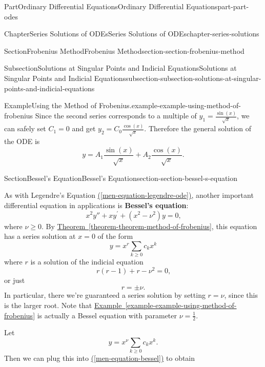 \documentclass[twoside,10pt,]{book}
\newcommand{\xreffont}{\relax}
\newcommand{\terminology}[1]{\textbf{#1}}
\numberwithin{equation}{part}
\begin{document}
\begin{partptx}{Part}{Ordinary Differential Equations}{}{Ordinary Differential Equations}{}{}{part-part-odes}
\begin{chapterptx}{Chapter}{Series Solutions of ODEs}{}{Series Solutions of ODEs}{}{}{chapter-series-solutions}
\begin{sectionptx}{Section}{Frobenius Method}{}{Frobenius Method}{}{}{section-section-frobenius-method}
\begin{subsectionptx}{Subsection}{Solutions at Singular Points and Indicial Equations}{}{Solutions at Singular Points and Indicial Equations}{}{}{subsection-subsection-solutions-at-singular-points-and-indicial-equations}
\begin{example}{Example}{Using the Method of Frobenius.}{example-example-using-method-of-frobenius}
Since the second series corresponds to a multiple of \(y_1 = \frac{\sin(x)}{\sqrt{x}}\), we can safely set \(C_1 = 0\) and get \(y_2 = C_0\frac{\cos(x)}{\sqrt{x}}\). Therefore the general solution of the ODE is%
\begin{equation*}
y = A_1\frac{\sin(x)}{\sqrt{x}} + A_{2}\frac{\cos(x)}{\sqrt{x}}.
\end{equation*}
%
\end{example}
\end{subsectionptx}
\end{sectionptx}
%
%
\typeout{************************************************}
\typeout{************************************************}
%
\begin{sectionptx}{Section}{Bessel's Equation}{}{Bessel's Equation}{}{}{section-section-bessel-s-equation}
\begin{introduction}{}%
As with Legendre's Equation \hyperref[men-equation-legendre-ode]{({\xreffont\ref{men-equation-legendre-ode}})}, another important differential equation in applications is \terminology{Bessel's equation}:%
\begin{equation}
x^{2}y'' + xy^\prime + (x^{2} - \nu^{2})y = 0\text{,}\label{men-equation-bessel}
\end{equation}
where \(\nu \geq 0\). By \hyperref[theorem-theorem-method-of-frobenius]{Theorem~{\xreffont\ref{theorem-theorem-method-of-frobenius}}}, this equation has a series solution at \(x = 0\) of the form%
\begin{equation*}
y = x^{r}\sum_{k\geq0}c_{k}x^{k}
\end{equation*}
where \(r\) is a solution of the indicial equation%
\begin{equation*}
r(r - 1) + r - \nu^{2} = 0\text{,}
\end{equation*}
or just%
\begin{equation*}
r = \pm\nu\text{.}
\end{equation*}
In particular, there we're guaranteed a series solution by setting \(r = \nu\), since this is the larger root. Note that \hyperref[example-example-using-method-of-frobenius]{Example~{\xreffont\ref{example-example-using-method-of-frobenius}}} is actually a Bessel equation with parameter \(\nu = \frac{1}{2}\).%
\par
Let%
\begin{equation*}
y = x^{\nu}\sum_{k\geq0}c_{k}x^{k}\text{.}
\end{equation*}
Then we can plug this into \hyperref[men-equation-bessel]{({\xreffont\ref{men-equation-bessel}})} to obtain%

\end{introduction}
\end{sectionptx}
\end{chapterptx}
\end{partptx}
\end{document}
